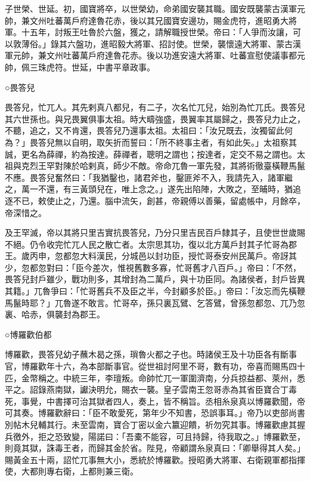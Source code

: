 \begin{pinyinscope}
 子世榮、世延。初，國寶將卒，以世榮幼，命弟國安襲其職。國安既襲蒙古漢軍元帥，兼文州吐蕃萬戶府達魯花赤，後以其兄國寶安邊功，賜金虎符，進昭勇大將軍。十五年，討叛王吐魯於六盤，獲之，請解職授世榮。帝曰：「人爭而汝讓，可以敦薄俗。」錄其六盤功，進昭毅大將軍、招討使。世榮，襲懷遠大將軍、蒙古漢軍元帥，兼文州吐蕃萬戶府達魯花赤。後以功進安遠大將軍、吐蕃宣慰使議事都元帥，佩三珠虎符。世延，中書平章政事。



 ○畏答兒



 畏答兒，忙兀人。其先剌真八都兒，有二子，次名忙兀兒，始別為忙兀氏。畏答兒其六世孫也。與兄畏翼俱事太祖。時大疇強盛，畏翼率其屬歸之，畏答兒力止之，不聽，追之，又不肯還，畏答兒乃還事太祖。太祖曰：「汝兄既去，汝獨留此何為？」畏答兒無以自明，取矢折而誓曰：「所不終事主者，有如此矢。」太祖察其誠，更名為薛禪，約為按達。薛禪者，聰明之謂也；按達者，定交不易之謂也。太祖與克烈王罕對陳於哈剌真，師少不敵。帝命兀魯一軍先發，其將術徹臺橫鞭馬鬣不應。畏答兒奮然曰：「我猶鑿也，諸君斧也，鑿匪斧不入，我請先入，諸軍繼之，萬一不還，有三黃頭兒在，唯上念之。」遂先出陷陣，大敗之，至晡時，猶追逐不已，敕使止之，乃還。腦中流矢，創甚，帝親傅以善藥，留處帳中，月餘卒，帝深惜之。



 及王罕滅，帝以其將只里吉實抗畏答兒，乃分只里吉民百戶隸其子，且使世世歲賜不絕。仍令收完忙兀人民之散亡者。太宗思其功，復以北方萬戶封其子忙哥為郡王。歲丙申，忽都忽大料漢民，分城邑以封功臣，授忙哥泰安州民萬戶。帝訝其少，忽都忽對曰：「臣今差次，惟視舊數多寡，忙哥舊才八百戶。」帝曰：「不然，畏答兒封戶雖少，戰功則多，其增封為二萬戶，與十功臣同。為諸侯者，封戶皆異其籍。」兀魯爭曰：「忙哥舊兵不及臣之半，今封顧多於臣。」帝曰：「汝忘而先橫鞭馬鬣時耶？」兀魯遂不敢言。忙哥卒，孫只裏瓦鷿、乞答鷿，曾孫忽都忽、兀乃忽裏、哈赤，俱襲封為郡王。



 ○博羅歡伯都



 博羅歡，畏答兒幼子蘸木曷之孫，瑣魯火都之子也。時諸侯王及十功臣各有斷事官，博羅歡年十六，為本部斷事官。從世祖討阿里不哥，數有功，帝喜而賜馬四十匹，金幣稱之。中統三年，李璮叛。命帥忙兀一軍圍濟南，分兵掠益都、萊州，悉平之。詔錄燕南獄，讞決明允，賜衣一襲。皇子雲南王忽哥赤為其省臣寶合丁毒死，事覺，中書擇可治其獄者四人，奏上，皆不稱旨。丞相糸泉真以博羅歡聞，帝可其奏。博羅歡辭曰：「臣不敢愛死，第年少不知書，恐誤事耳。」帝乃以吏部尚書別帖木兒輔其行。未至雲南，寶合丁密以金六籝迎饋，祈勿究其事。博羅歡慮其握兵徼外，拒之恐致變，陽諾曰：「吾橐不能容，可且持歸，待我取之。」博羅歡至，則竟其獄，誅毒王者，而歸其金於省。陛見，帝顧謂糸泉真曰：「卿舉得其人矣。」賜黃金五十兩，詔忙兀事無大小，悉統於博羅歡。授昭勇大將軍、右衛親軍都指揮使，大都則專右衛，上都則兼三衛。




\end{pinyinscope}
